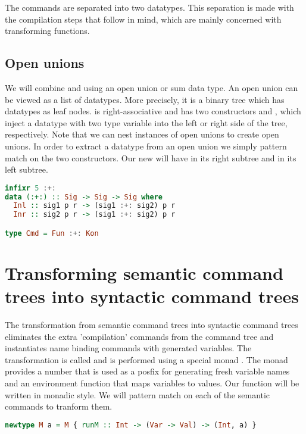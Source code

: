 The commands are separated into two datatypes. This separation is made with the compilation steps that follow in mind, which are mainly concerned with transforming functions.

\subsection{\label{section:openunion}Open unions}
We will combine  and  using an open union or sum data type. An open union can be viewed as a list of datatypes. More precisely, it is a binary tree which has datatypes as leaf nodes. \lstinlineb{:+:} is right-associative and has two constructors  and , which inject a datatype with two type variable into the left or right side of the tree, respectively. Note that we can nest instances of open unions to create open unions. In order to extract a datatype from an open union we simply pattern match on the two constructors. Our new  will have  in its right subtree and  in its left subtree.

\begin{lstlisting}[language=Haskell]
infixr 5 :+:
data (:+:) :: Sig -> Sig -> Sig where
  Inl :: sig1 p r -> (sig1 :+: sig2) p r
  Inr :: sig2 p r -> (sig1 :+: sig2) p r

type Cmd = Fun :+: Kon
\end{lstlisting}


\section{\label{section:semtosyn}Transforming semantic command trees into syntactic command trees}
The transformation from semantic command trees into syntactic command trees eliminates the extra 'compilation' commands from the command tree and instantiates name binding commands with generated variables. The transformation is called  and is performed using a special monad . The monad  provides a number that is used as a posfix for generating fresh variable names and an environment function that maps variables to values. Our  function will be written in monadic style. We will pattern match on each of the semantic commands to tranform them.

\begin{lstlisting}[language=Haskell]
newtype M a = M { runM :: Int -> (Var -> Val) -> (Int, a) }
\end{lstlisting}

